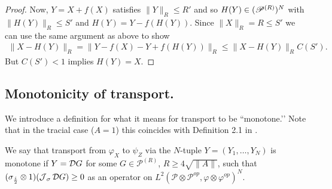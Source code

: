 \begin{proof}
Now, $Y=X+f(X)$ satisfies $\|Y\|_R\leq R'$ and so $H(Y)\in (\P^{(R)})^N$ with $\|H(Y)\|_R \leq S'$ and $H(Y)=Y- f(H(Y))$. Since $\|X\|_R=R\leq S'$ we can use the same argument as above to show
	\begin{align*}
		\| X- H(Y)\|_R = \| Y - f(X) - Y+ f(H(Y))\|_R \leq \| X - H(Y)\|_R C(S').
	\end{align*}
But $C(S')<1$ implies $H(Y)=X$.
\end{proof}



\subsection{Monotonicity of transport.}

We introduce a definition for what it means for transport to be ``monotone.\rq{}\rq{} Note that in the tracial case ($A=1$) this coincides with Definition 2.1 in \cite{GS14}.
\begin{defi}
We say that transport from $\varphi_X$ to $\psi_Z$ via the $N$-tuple $Y=(Y_1,\ldots, Y_N)$ is monotone if $Y=\D G$ for some $G\in \mathscr{P}^{(R)}$, $R\geq4\sqrt{\|A\|}$, such that $(\sigma_\frac{i}{2}\otimes 1)(\J_\sigma \D G)\geq 0$ as an operator on $L^2(\mathscr{P}\otimes\mathscr{P}^{op},\varphi\otimes\varphi^{op})^N$.
\end{defi}

